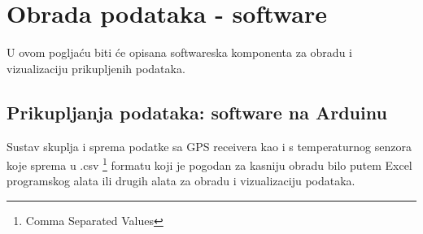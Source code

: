 \chapter{Obrada podataka - software}
U ovom pogljaću biti će opisana softwareska komponenta za obradu i vizualizaciju prikupljenih podataka.
\section{Prikupljanja podataka: software na Arduinu}
Sustav skuplja i sprema podatke sa GPS receivera kao i s temperaturnog senzora koje sprema u .csv \footnote{Comma Separated Values} formatu koji je pogodan za kasniju obradu bilo putem Excel programskog alata ili drugih alata za obradu i vizualizaciju podataka.



